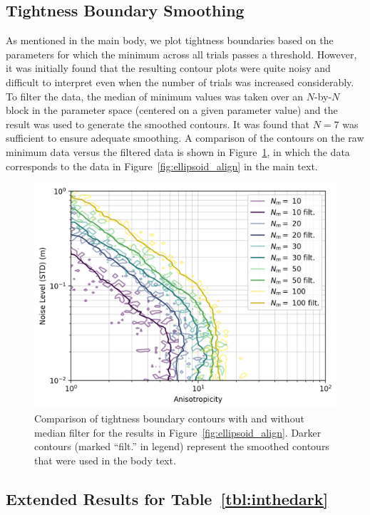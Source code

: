 \documentclass[lettersize,journal]{IEEEtran}
\newcommand{\rev}[1]{\color{red}{#1}\color{black}}
\begin{document}
\subsection{Tightness Boundary Smoothing}\label{App:Smoothing}

As mentioned in the main body, we plot tightness boundaries based on the parameters for which the minimum \rev{ER } across all trials passes a threshold. \rev{These contours were plotted using the `contour' function from PyPlot. } However, it was initially found that the resulting contour plots were quite noisy and difficult to interpret even when the number of trials was increased considerably. To filter the data, the median of minimum \rev{ER } values was taken over an $N$-by-$N$ block in the parameter space (centered on a given parameter value) and the result was used to generate the smoothed contours. It was found that $N=7$ was sufficient to ensure adequate smoothing. A comparison of the contours on the raw minimum \rev{ER } data versus the filtered data is shown in Figure~\ref{fig:filter}, in which the data corresponds to the data in Figure~\ref{fig:ellipsoid_align} in the main text. 
\begin{figure}[!ht]
	\centering
	\includegraphics[width=\columnwidth]{figs/filter_compare}
	\caption{Comparison of tightness boundary contours with and without median filter for the results in Figure~\ref{fig:ellipsoid_align}. Darker contours (marked ``filt.'' in legend) represent the smoothed contours that were used in the body text.}
	\label{fig:filter}
\end{figure}


\subsection{Extended Results for Table~\ref{tbl:inthedark}}\label{App:inthedarkExt}
\end{document}
